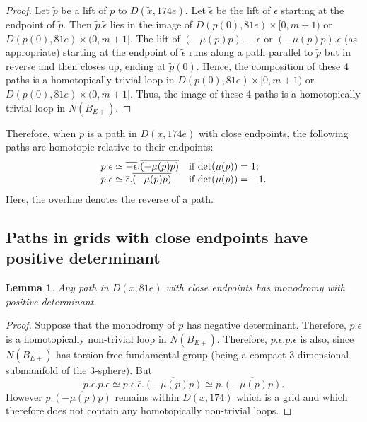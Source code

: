 \documentclass[oneside]{amsart}
\numberwithin{equation}{section}
\theoremstyle{plain}
\newtheorem{lemma}[equation]{Lemma}
\theoremstyle{definition}
\begin{document}
\begin{proof}
Let $\tilde p$ be a lift of $p$ to $D(\tilde x, 174e)$. Let $\tilde \epsilon$ be the lift of $\epsilon$ starting at the endpoint of 
$\tilde p$. Then $\tilde p. \tilde \epsilon$ lies in the image of $D(p(0), 81e) \times [0, m+1)$  or $D(p(0), 81e) \times (0,m+1]$. The lift of 
$(-\mu(p)p). -\epsilon$ or $(-\mu(p)p). \epsilon$ (as appropriate) starting at the endpoint of $\tilde \epsilon$
runs along a path parallel to $\tilde p$ but in reverse and then closes up, ending at $\tilde p(0)$. Hence,
the composition of these 4 paths is a homotopically trivial loop in $D(p(0), 81e) \times [0, m+1)$  or $D(p(0), 81e) \times (0,m+1]$.
Thus, the image of these 4 paths is a homotopically trivial loop in $N(B_{E+})$.
\end{proof}

Therefore, when $p$ is a path in $D(x,174e)$ with close endpoints, the following paths are homotopic relative to their endpoints:
$$
\begin{array}{ll}
p . \epsilon \simeq \overline{-\epsilon}. \overline{(-\mu(p)p)}  & \text{if } {\rm det}(\mu(p)) = 1; \cr
p . \epsilon \simeq  \overline{\epsilon}. \overline{(-\mu(p)p)} & \text{if } {\rm det}(\mu(p)) = -1. \cr
\end{array}
$$
Here, the overline denotes the reverse of a path.

\subsection{Paths in grids with close endpoints have positive determinant}

\begin{lemma}
\label{Lem:PositiveDeterminant}
Any  path
in $D(x,81e)$ with close endpoints has monodromy with positive determinant.
\end{lemma}

\begin{proof}
Suppose that the monodromy of $p$ has negative determinant.
Therefore, $p. \epsilon$ is a homotopically non-trivial loop in $N(B_{E+})$. Therefore,
$p.\epsilon.p.\epsilon$ is also, since $N(B_{E+})$ has torsion free fundamental group
(being a compact 3-dimensional submanifold of the 3-sphere).
But
$$p.\epsilon.p.\epsilon \simeq p.\epsilon. \overline{\epsilon}. \overline{(-\mu(p)p)}
\simeq p. \overline{(-\mu(p)p)}.$$
However $p. \overline{(-\mu(p)p)}$ remains within $D(x,174)$ which is a grid and which
therefore does not contain any homotopically non-trivial loops.
\end{proof}
\end{document}

